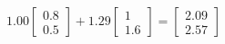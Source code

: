 \documentclass[preview]{standalone}
\begin{document}
\begin{align*}
1.00 \begin{bmatrix} 0.8 \\ 0.5 \end{bmatrix} + 1.29 \begin{bmatrix} 1 \\ 1.6 \end{bmatrix} = \begin{bmatrix} 2.09 \\ 2.57 \end{bmatrix}
\end{align*}
\end{document}
